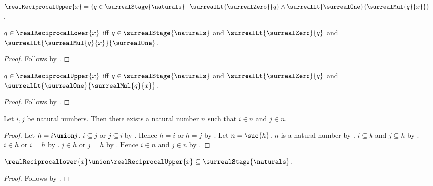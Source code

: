 \begin{definition}\label{surreal_real_reciprocal_upper}
    $\realReciprocalUpper{x}=
        \{q\in\surrealStage{\naturals}\mid
            \surrealLt{\surrealZero}{q}\land
            \surrealLt{\surrealOne}{\surrealMul{q}{x}}\}$.
\end{definition}

\begin{proposition}\label{surreal_real_reciprocal_lower_iff}
    $q\in\realReciprocalLower{x}$ iff
        $q\in\surrealStage{\naturals}$ and
        $\surrealLt{\surrealZero}{q}$ and
        $\surrealLt{\surrealMul{q}{x}}{\surrealOne}$.
\end{proposition}
\begin{proof}
    Follows by .
\end{proof}

\begin{proposition}\label{surreal_real_reciprocal_upper_iff}
    $q\in\realReciprocalUpper{x}$ iff
        $q\in\surrealStage{\naturals}$ and
        $\surrealLt{\surrealZero}{q}$ and
        $\surrealLt{\surrealOne}{\surrealMul{q}{x}}$.
\end{proposition}
\begin{proof}
    Follows by .
\end{proof}

\begin{lemma}\label{natural_common_strict_upper_bound}
    Let $i,j$ be natural numbers.
    Then there exists a natural number $n$ such that
        $i\in n$ and $j\in n$.
\end{lemma}
\begin{proof}
    Let $h=i\union j$.
    $i\subseteq j$ or $j\subseteq i$
        by
        .
    Hence $h=i$ or $h=j$
        by
        .
    Let $n=\suc{h}$.
    $n$ is a natural number by .
    $i\subseteq h$ and $j\subseteq h$
        by .
    $i\in h$ or $i=h$
        by
        .
    $j\in h$ or $j=h$
        by
        .
    Hence $i\in n$ and $j\in n$ by .
\end{proof}

\begin{proposition}\label{surreal_real_reciprocal_bounds_finite_stage}
    $\realReciprocalLower{x}\union\realReciprocalUpper{x}
        \subseteq\surrealStage{\naturals}$.
\end{proposition}
\begin{proof}
    Follows by
        .
\end{proof}

